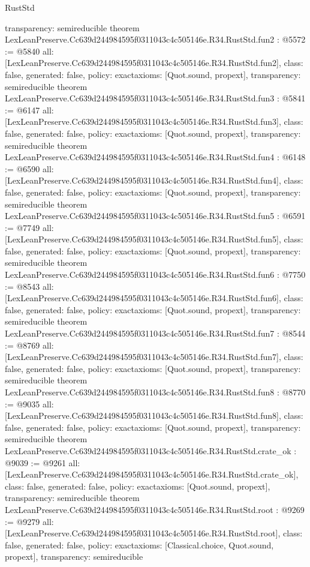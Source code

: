 \begin{lexlean}{RustStd}
\begin{coremodule}
{  transparency: semireducible
}
theorem LexLeanPreserve.Cc639d244984595f0311043c4c505146e.R34.RustStd.fun2 : @5572 := @5840 {
  all: [LexLeanPreserve.Cc639d244984595f0311043c4c505146e.R34.RustStd.fun2],
  class: false,
  generated: false,
  policy: exact{axioms: [Quot.sound, propext]},
  transparency: semireducible
}
theorem LexLeanPreserve.Cc639d244984595f0311043c4c505146e.R34.RustStd.fun3 : @5841 := @6147 {
  all: [LexLeanPreserve.Cc639d244984595f0311043c4c505146e.R34.RustStd.fun3],
  class: false,
  generated: false,
  policy: exact{axioms: [Quot.sound, propext]},
  transparency: semireducible
}
theorem LexLeanPreserve.Cc639d244984595f0311043c4c505146e.R34.RustStd.fun4 : @6148 := @6590 {
  all: [LexLeanPreserve.Cc639d244984595f0311043c4c505146e.R34.RustStd.fun4],
  class: false,
  generated: false,
  policy: exact{axioms: [Quot.sound, propext]},
  transparency: semireducible
}
theorem LexLeanPreserve.Cc639d244984595f0311043c4c505146e.R34.RustStd.fun5 : @6591 := @7749 {
  all: [LexLeanPreserve.Cc639d244984595f0311043c4c505146e.R34.RustStd.fun5],
  class: false,
  generated: false,
  policy: exact{axioms: [Quot.sound, propext]},
  transparency: semireducible
}
theorem LexLeanPreserve.Cc639d244984595f0311043c4c505146e.R34.RustStd.fun6 : @7750 := @8543 {
  all: [LexLeanPreserve.Cc639d244984595f0311043c4c505146e.R34.RustStd.fun6],
  class: false,
  generated: false,
  policy: exact{axioms: [Quot.sound, propext]},
  transparency: semireducible
}
theorem LexLeanPreserve.Cc639d244984595f0311043c4c505146e.R34.RustStd.fun7 : @8544 := @8769 {
  all: [LexLeanPreserve.Cc639d244984595f0311043c4c505146e.R34.RustStd.fun7],
  class: false,
  generated: false,
  policy: exact{axioms: [Quot.sound, propext]},
  transparency: semireducible
}
theorem LexLeanPreserve.Cc639d244984595f0311043c4c505146e.R34.RustStd.fun8 : @8770 := @9035 {
  all: [LexLeanPreserve.Cc639d244984595f0311043c4c505146e.R34.RustStd.fun8],
  class: false,
  generated: false,
  policy: exact{axioms: [Quot.sound, propext]},
  transparency: semireducible
}
theorem LexLeanPreserve.Cc639d244984595f0311043c4c505146e.R34.RustStd.crate_ok : @9039 := @9261 {
  all: [LexLeanPreserve.Cc639d244984595f0311043c4c505146e.R34.RustStd.crate_ok],
  class: false,
  generated: false,
  policy: exact{axioms: [Quot.sound, propext]},
  transparency: semireducible
}
theorem LexLeanPreserve.Cc639d244984595f0311043c4c505146e.R34.RustStd.root : @9269 := @9279 {
  all: [LexLeanPreserve.Cc639d244984595f0311043c4c505146e.R34.RustStd.root],
  class: false,
  generated: false,
  policy: exact{axioms: [Classical.choice, Quot.sound, propext]},
  transparency: semireducible
}


\end{coremodule}
\end{lexlean}
